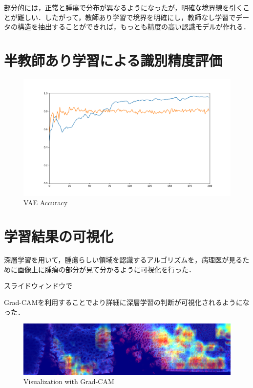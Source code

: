 部分的には，正常と腫瘍で分布が異なるようになったが，明確な境界線を引くことが難しい．したがって，教師あり学習で境界を明確にし，教師なし学習でデータの構造を抽出することができれば，もっとも精度の高い認識モデルが作れる．

\section{半教師あり学習による識別精度評価}
\begin{figure}
	\centering
	\includegraphics[width=0.7\linewidth]{fig/chapter4/accuracy_summary}
	\caption{VAE Accuracy}
	\label{fig:accuracysummary}
\end{figure}



\section{学習結果の可視化}
深層学習を用いて，腫瘍らしい領域を認識するアルゴリズムを，病理医が見るために画像上に腫瘍の部分が見て分かるように可視化を行った．

スライドウィンドウで

Grad-CAMを利用することでより詳細に深層学習の判断が可視化されるようになった．
\begin{figure}
	\centering
	\includegraphics[width=0.7\linewidth]{fig/chapter4/large-grad-cam-step100-rm-black}
	\caption{Visualization with Grad-CAM}
	\label{fig:large-grad-cam-step100-rm-black}
\end{figure}
